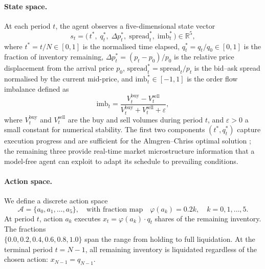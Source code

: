 \documentclass[11pt]{article}
\begin{document}
\paragraph{State space.}
At each period $t$, the agent observes a five-dimensional state vector
\begin{equation}\label{eq:state_vector}
    s_t = \bigl(\, t^*,\; q_t^*,\; \Delta p_t^*,\; \mathrm{spread}_t^*,\; \mathrm{imb}_t^* \,\bigr) \in \mathbb{R}^5,
\end{equation}
where $t^* = t/N \in [0,1]$ is the normalised time elapsed, $q_t^* = q_t/q_0 \in [0,1]$ is the fraction of inventory remaining, $\Delta p_t^* = (p_t - p_0)/p_0$ is the relative price displacement from the arrival price $p_0$, $\mathrm{spread}_t^* = \mathrm{spread}_t / p_t$ is the bid--ask spread normalised by the current mid-price, and $\mathrm{imb}_t^* \in [-1,1]$ is the order flow imbalance defined as
\begin{equation}\label{eq:imbalance}
    \mathrm{imb}_t = \frac{V_t^{\mathrm{buy}} - V_t^{\mathrm{sell}}}{V_t^{\mathrm{buy}} + V_t^{\mathrm{sell}} + \varepsilon},
\end{equation}
where $V_t^{\mathrm{buy}}$ and $V_t^{\mathrm{sell}}$ are the buy and sell volumes during period $t$, and $\varepsilon > 0$ a small constant for numerical stability. The first two components $(t^*, q_t^*)$ capture execution progress and are sufficient for the Almgren--Chriss optimal solution \citet{almgren2001optimal}; the remaining three provide real-time market microstructure information that a model-free agent can exploit to adapt its schedule to prevailing conditions.
\paragraph{Action space.}
We define a discrete action space
\begin{equation}\label{eq:actions}
    \mathcal{A} = \{a_0, a_1, \ldots, a_5\}, \quad \text{with fraction map} \quad \varphi(a_k) = 0.2k, \quad k = 0, 1, \ldots, 5.
\end{equation}
At period $t$, action $a_k$ executes $x_t = \varphi(a_k) \cdot q_t$ shares of the remaining inventory. The fractions \\ $\{0.0, 0.2, 0.4, 0.6, 0.8, 1.0\}$ span the range from holding to full liquidation. At the terminal period $t = N-1$, all remaining inventory is liquidated regardless of the chosen action: $x_{N-1} = q_{N-1}$.
\end{document}
